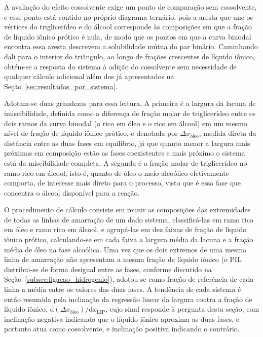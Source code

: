 A avaliação do efeito cossolvente exige um ponto de comparação sem cossolvente, e esse ponto está contido no próprio diagrama ternário, pois a aresta que une os vértices do triglicerídeo e do álcool corresponde às composições em que a fração de líquido iônico prótico é nula, de modo que os pontos em que a curva binodal encontra essa aresta descrevem a solubilidade mútua do par binário. Caminhando dali para o interior do triângulo, ao longo de frações crescentes de líquido iônico, obtém-se a resposta do sistema à adição do cossolvente sem necessidade de qualquer cálculo adicional além dos já apresentados na Seção~\ref{sec:resultados_por_sistema}.

Adotam-se duas grandezas para essa leitura. A primeira é a largura da lacuna de imiscibilidade, definida como a diferença de fração molar de triglicerídeo entre os dois ramos da curva binodal (o rico em óleo e o rico em álcool) em um mesmo nível de fração de líquido iônico prótico, e denotada por $\Delta x_{\text{óleo}}$, medida direta da distância entre as duas fases em equilíbrio, já que quanto menor a largura mais próximas em composição estão as fases coexistentes e mais próximo o sistema está da miscibilidade completa. A segunda é a fração molar de triglicerídeo no ramo rico em álcool, isto é, quanto de óleo o meio alcoólico efetivamente comporta, de interesse mais direto para o processo, visto que é essa fase que concentra o álcool disponível para a reação.

O procedimento de cálculo consiste em reunir as composições das extremidades de todas as linhas de amarração de um dado sistema, classificá-las em ramo rico em óleo e ramo rico em álcool, e agrupá-las em dez faixas de fração de líquido iônico prótico, calculando-se em cada faixa a largura média da lacuna e a fração média de óleo na fase alcoólica. Uma vez que os dois extremos de uma mesma linha de amarração não apresentam a mesma fração de líquido iônico (o PIL distribui-se de forma desigual entre as fases, conforme discutido na Seção~\ref{subsec:ligacao_hidrogenio}), adotou-se como fração de referência de cada linha a média entre os valores das duas fases. A tendência de cada sistema é então resumida pela inclinação da regressão linear da largura contra a fração de líquido iônico, $\mathrm{d}(\Delta x_{\text{óleo}})/\mathrm{d}x_{\text{LIP}}$, cujo sinal responde à pergunta desta seção, com inclinação negativa indicando que o líquido iônico aproxima as duas fases, e portanto atua como cossolvente, e inclinação positiva indicando o contrário.

